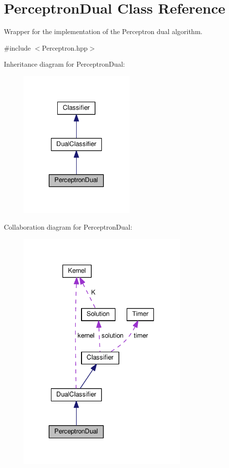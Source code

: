 \hypertarget{class_perceptron_dual}{}\section{Perceptron\+Dual Class Reference}
\label{class_perceptron_dual}


Wrapper for the implementation of the Perceptron dual algorithm.  




{\ttfamily \#include $<$Perceptron.\+hpp$>$}



Inheritance diagram for Perceptron\+Dual\+:\nopagebreak
\begin{figure}[H]
\begin{center}
\leavevmode
\includegraphics[width=164pt]{class_perceptron_dual__inherit__graph}
\end{center}
\end{figure}


Collaboration diagram for Perceptron\+Dual\+:\nopagebreak
\begin{figure}[H]
\begin{center}
\leavevmode
\includegraphics[width=242pt]{class_perceptron_dual__coll__graph}
\end{center}
\end{figure}
